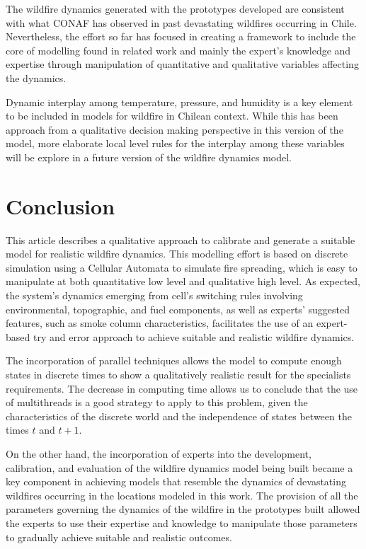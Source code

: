 \documentclass[conference]{IEEEtran}
\begin{document}
    The wildfire dynamics generated with the prototypes developed are consistent with what CONAF has observed in past 
    devastating wildfires occurring in Chile. Nevertheless, the effort so far has focused in creating a 
    framework to include the core of modelling found in related work and mainly the expert’s knowledge and 
    expertise through manipulation of quantitative and qualitative variables affecting the dynamics.  

    Dynamic interplay among temperature, pressure, and humidity is a key element to be included in models for 
    wildfire in Chilean context. While this has been approach from a qualitative decision making perspective 
    in this version of the model, more elaborate local level rules for the interplay among these variables will 
    be explore in a future version of the wildfire dynamics model. 


  \section{Conclusion}
    
    This article describes a qualitative approach to calibrate and generate a suitable model for realistic 
    wildfire dynamics. 
    This modelling effort is based on discrete simulation using a Cellular Automata to simulate fire spreading, 
    which is easy to manipulate at both quantitative low level and qualitative high level. As expected, the system’s 
    dynamics emerging from cell’s switching rules involving environmental, topographic, and fuel components, as well 
    as experts’ suggested features, such as smoke column characteristics, facilitates the use of an expert-based try 
    and error approach to achieve suitable and realistic wildfire dynamics. 
    
    The incorporation of parallel techniques allows the model to compute enough states in discrete times to show 
    a qualitatively realistic result for the specialists requirements. The decrease in computing time allows 
    us to conclude that the use of multithreads is a good strategy to apply to this problem, given the characteristics 
    of the discrete world and the independence of states between the times $t$ and $t + 1$.

    On the other hand, the incorporation of experts into the development, calibration, and evaluation of the wildfire 
    dynamics model being built became a key component in achieving models that resemble the dynamics of devastating 
    wildfires occurring in the locations modeled in this work. The provision of all the parameters governing the 
    dynamics of the wildfire in the prototypes built allowed the experts to use their expertise and knowledge to 
    manipulate those parameters to gradually achieve suitable and realistic outcomes. 
\end{document}
